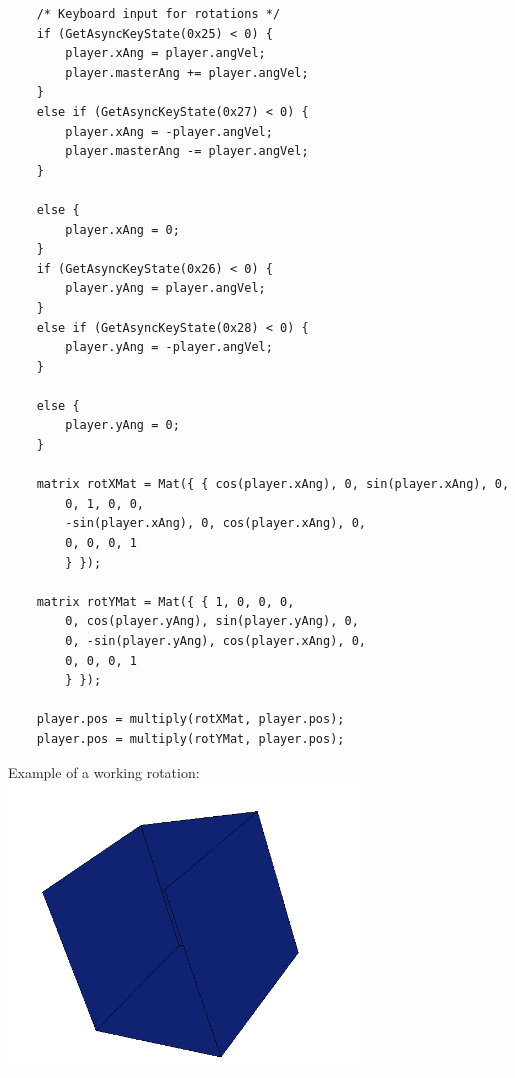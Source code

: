 \documentclass{article}
\begin{document}
\begin{lstlisting}
	/* Keyboard input for rotations */
	if (GetAsyncKeyState(0x25) < 0) {
		player.xAng = player.angVel;
		player.masterAng += player.angVel;
	}
	else if (GetAsyncKeyState(0x27) < 0) {
		player.xAng = -player.angVel;
		player.masterAng -= player.angVel;
	}

	else {
		player.xAng = 0;
	}
	if (GetAsyncKeyState(0x26) < 0) {
		player.yAng = player.angVel;
	}
	else if (GetAsyncKeyState(0x28) < 0) {
		player.yAng = -player.angVel;
	}

	else {
		player.yAng = 0;
	}

	matrix rotXMat = Mat({ { cos(player.xAng), 0, sin(player.xAng), 0,
		0, 1, 0, 0,
		-sin(player.xAng), 0, cos(player.xAng), 0,
		0, 0, 0, 1
		} });

	matrix rotYMat = Mat({ { 1, 0, 0, 0,
		0, cos(player.yAng), sin(player.yAng), 0,
		0, -sin(player.yAng), cos(player.xAng), 0,
		0, 0, 0, 1
		} });

	player.pos = multiply(rotXMat, player.pos);
	player.pos = multiply(rotYMat, player.pos);
\end{lstlisting}
Example of a working rotation:
\newline
\includegraphics[width=0.7\textwidth]{rotated_cube.png}
\end{document}
